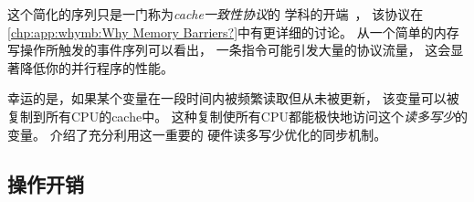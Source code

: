 这个简化的序列只是一门称为\emph{cache一致性协议}的
学科的开端~\cite{Hennessy2026,DavidECuller1999,MiloMKMartin2012scale,DanielJSorin2011MemModel}，
该协议在\cref{chp:app:whymb:Why Memory Barriers?}中有更详细的讨论\@。
从一个简单的内存写操作所触发的事件序列可以看出，
一条指令可能引发大量的协议流量，
这会显著降低你的并行程序的性能。

幸运的是，如果某个变量在一段时间内被频繁读取但从未被更新，
该变量可以被复制到所有CPU的cache中。
这种复制使所有CPU都能极快地访问这个\emph{读多写少}的变量。
介绍了充分利用这一重要的
硬件读多写少优化的同步机制。

\subsection{操作开销}
\label{sec:cpu:Costs of Operations}

